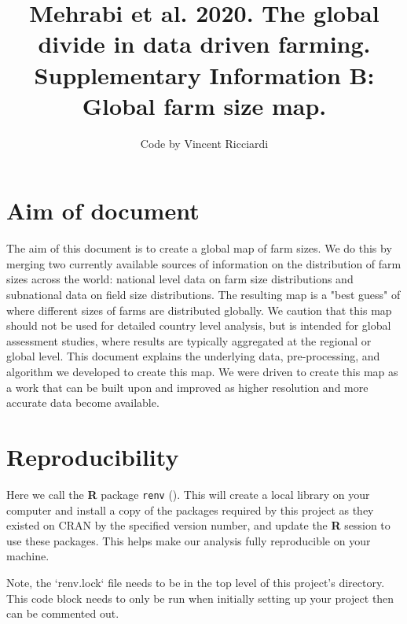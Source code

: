 \documentclass{article}
\title{Mehrabi et al. 2020. The global divide in data driven farming. Supplementary Information B: Global farm size map.}
\author{Code by Vincent Ricciardi}
\begin{document}





\maketitle

\tableofcontents

\newpage
\section{Aim of document}

The aim of this document is to create a global map of farm sizes. We do this by merging two currently available sources of information on the distribution of farm sizes across the world: national level data on farm size distributions and subnational data on field size distributions. The resulting map is a "best guess" of where different sizes of farms are distributed globally. We caution that this map should not be used for detailed country level analysis, but is intended for global assessment studies, where results are typically aggregated at the regional or global level. This document explains the underlying data, pre-processing, and algorithm we developed to create this map. We were driven to create this map as a work that can be built upon and improved as higher resolution and more accurate data become available.

\section{Reproducibility}
\label{reproducibility}

Here we call the  \textbf{R} package \texttt{renv} (\cite{R-renv}). This will create a local library on your computer and install a copy of the packages required by this project as they existed on CRAN by the specified version number, and update the \textbf{R} session to use these packages. This helps make our analysis fully reproducible on your machine. 

Note, the `renv.lock` file needs to be in the top level of this project's directory. This code block needs to only be run when initially setting up your project then can be commented out.
\end{document}
